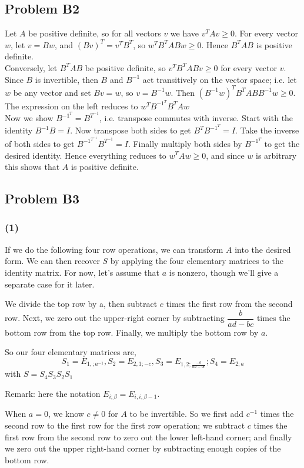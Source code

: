\documentclass{article}
\begin{document}
\subsection{Problem B2}
Let $A$ be positive definite, so for all vectors $v$ we have $v^TAv\ge 0$. For every vector $w$, let $v=Bw$, and $(Bv)^T=v^TB^T$, so $w^TB^TABw\ge 0$. Hence $B^TAB$ is positive definite.
\\Conversely, let $B^TAB$ be positive definite, so $v^TB^TABv \ge 0$ for every vector $v$. Since $B$ is invertible, then $B$ and $B^{-1}$ act transitively on the vector space; i.e. let $w$ be any vector and set $Bv=w$, so $v=B^{-1}w$. Then $(B^{-1}w)^TB^TABB^{-1}w\ge 0$. The expression on the left reduces to $w^TB^{-1^T}B^TAw$
\\Now we show $B^{-1^T}=B^{T^{-1}}$, i.e. transpose commutes with inverse. Start with the identity $B^{-1}B=I$. Now transpose both sides to get $B^TB^{-1^T}=I$. Take the inverse of both sides to get $B^{-1^{T^{-1}}}B^{T^{-1}}=I$. Finally multiply both sides by $B^{-1^T}$ to get the desired identity. 
Hence everything reduces to $w^TAw\ge 0$, and since $w$ is arbitrary this shows that $A$ is positive definite. 

\subsection{Problem B3}
\subsubsection{(1)}
If we do the following four row operations, we can transform $A$ into the
desired form. We can then recover $S$ by applying the four elementary matrices
to the identity matrix. For now, let's assume that $a$ is nonzero, though we'll
give a separate case for it later.

We divide the top row by a, then subtract $c$ times the first row from the
second row. Next, we zero out the upper-right corner by subtracting
$\dfrac{b}{ad-bc}$ times the bottom row from the top row. Finally, we multiply
the bottom row by $a$.

So our four elementary matrices are,
\[S_1 = E_{1,;a^{-1}}, S_2 = E_{2,1;-c}, S_3 = E_{1,2 ; \frac{-b}{ad-bc}};
S_4 = E_{2; a}\]
with $S = S_4 S_3 S_2 S_1$

Remark: here the notation $E_{i; \beta}=E_{i,i,\beta -1}$. 

When $a = 0$, we know $c \neq 0$ for $A$ to be invertible. So we first add
$c^{-1}$ times the second row to the first row for the first row operation; we
subtract $c$ times the first row from the second row to zero out the lower
left-hand corner; and finally we zero out the upper right-hand corner by
subtracting enough copies of the bottom row.
\end{document}

